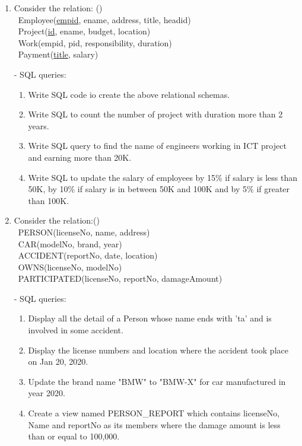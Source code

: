 \documentclass[12pt]{article}
\newcommand{\enter}{\\\textcolor{white}{1}}
\begin{document}
    \begin{enumerate}

    \item Consider the relation: \hfill()
        \enter Employee(\underline{empid}, ename, address, title, headid)
        \enter Project(\underline{id}, ename, budget, location)
        \enter Work(empid, pid, responsibility, duration)
        \enter Payment(\underline{title}, salary)

        - SQL queries:  
        \begin{enumerate}[noitemsep, topsep = 0pt, label = \alph*.]
            \item Write SQL code io create the above relational schemas.
            \item Write SQL to count the number of project with duration more than 2 years.
            \item Write SQL query to find the name of engineers working in ICT project and earning more than 20K.
            \item Write SQL to update the salary of employees by 15\% if salary is less than 50K, by 10\% if salary is in between 50K and 100K and by 5\% if greater than 100K.
        \end{enumerate}

    \item Consider the relation:\hfill()
        \enter PERSON(licenseNo, name, address)
        \enter CAR(modelNo, brand, year)
        \enter ACCIDENT(reportNo, date, location)
        \enter OWNS(licenseNo, modelNo)
        \enter PARTICIPATED(licenseNo, reportNo, damageAmount)
        
        - SQL queries: 
        \begin{enumerate}[noitemsep, topsep = 0pt, label = \alph*.]
            \item Display all the detail of a Person whose name ends with 'ta' and is involved in some accident.
            \item Display the license numbers and location where the accident took place on Jan 20, 2020.
            \item Update the brand name "BMW" to "BMW-X" for car manufactured in year 2020.
            \item Create a view named PERSON\_REPORT which contains licenseNo, Name and reportNo as its members where the damage amount is less than or equal to 100,000.
        \end{enumerate}


\end{enumerate}
\end{document}
